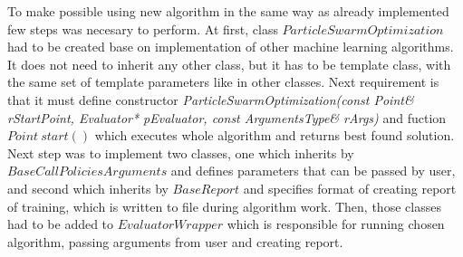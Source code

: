 To make possible using new algorithm in the same way as already implemented few steps was necesary to perform.
At first, class \(ParticleSwarmOptimization\) had to be created base on implementation of other machine learning algorithms. 
It does not need to inherit any other class, but it has to be template class, with the same set of template parameters like in other classes. 
Next requirement is that it must define constructor \textit{ParticleSwarmOptimization(const Point\& rStartPoint, Evaluator* pEvaluator, const ArgumentsType\& rArgs)} 
and fuction \(Point\ start()\) which executes whole algorithm and returns best found solution.
Next step was to implement two classes, one which inherits by \(BaseCallPoliciesArguments\) and defines parameters that can be passed by user, 
and second which inherits by \(BaseReport\) and specifies format of creating report of training, which is written to file during algorithm work.
Then, those classes had to be added to \(EvaluatorWrapper\) which is responsible for running chosen algorithm, 
passing arguments from user and creating report.






        

        
        


